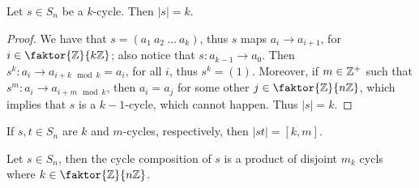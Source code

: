 \begin{proposition}\label{proposition_1.3.6}
  Let $s \in S_n$ be a $k$-cycle. Then $|s|=k$.
\end{proposition}
\begin{proof}
  We have that $s=(a_1 \ a_2 \ \dots \ a_k)$, thus $s$ maps  $a_i
  \rightarrow a_{i+1}$, for $i \in \faktor{\Z}{k\Z}$; also notice that
  $s:a_{k-1} \rightarrow a_0$. Then $s^k:a_i \rightarrow a_{i+k
  \mod{k}}=a_i$, for all  $i$, thus  $s^k=(1)$. Moreover, if $m \in \mathbb{Z}^+$
  such that $s^m:a_i \rightarrow a_{i+m \mod{k}}$, then $a_i=a_j$ for
  some other  $j \in \faktor{\Z}{n\Z}$, which implies that $s$ is a
  $k-1$-cycle, which cannot happen. Thus $|s|=k$.
\end{proof}
\begin{corollary}
  If $s,t \in S_n$ are  $k$ and $m$-cycles, respectively, then
  $|st|=[k,m]$.
\end{corollary}
\begin{corollary}
  Let $s \in S_n$, then the cycle composition of  $s$ is a product of disjoint
  $m_k$ cycls where $k \in \faktor{\Z}{n\Z}$.
\end{corollary}
